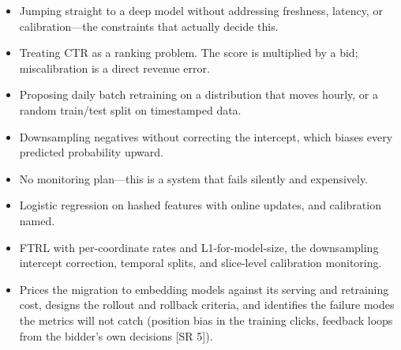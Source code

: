\begin{interviewq}
\redflags
\begin{itemize}
    \item Jumping straight to a deep model without addressing freshness, latency, or calibration---the constraints that actually decide this.
    \item Treating CTR as a ranking problem. The score is multiplied by a bid; miscalibration is a direct revenue error.
    \item Proposing daily batch retraining on a distribution that moves hourly, or a random train/test split on timestamped data.
    \item Downsampling negatives without correcting the intercept, which biases every predicted probability upward.
    \item No monitoring plan---this is a system that fails silently and expensively.
\end{itemize}


\goodgreat
\begin{itemize}
    \item {} Logistic regression on hashed features with online updates, and calibration named.
    \item {} FTRL with per-coordinate rates and L1-for-model-size, the downsampling intercept correction, temporal splits, and slice-level calibration monitoring.
    \item {} Prices the migration to embedding models against its serving and retraining cost, designs the rollout and rollback criteria, and identifies the failure modes the metrics will not catch (position bias in the training clicks, feedback loops from the bidder's own decisions [SR 5]).
\end{itemize}

\end{interviewq}
